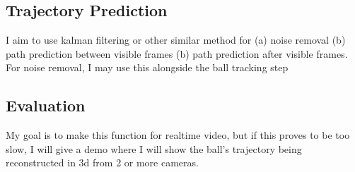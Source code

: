 \documentclass{article}
\begin{document}
\subsection{Trajectory Prediction}

I aim to use kalman filtering or other similar method for (a) noise removal (b) path prediction between visible frames (b) path prediction after visible frames. For noise removal, I may use this alongside the ball tracking step

\subsection{Evaluation}

My goal is to make this function for realtime video, but if this proves to be too slow, I will give a demo where I will show the ball's trajectory being reconstructed in 3d from 2 or more cameras.


\end{document}
